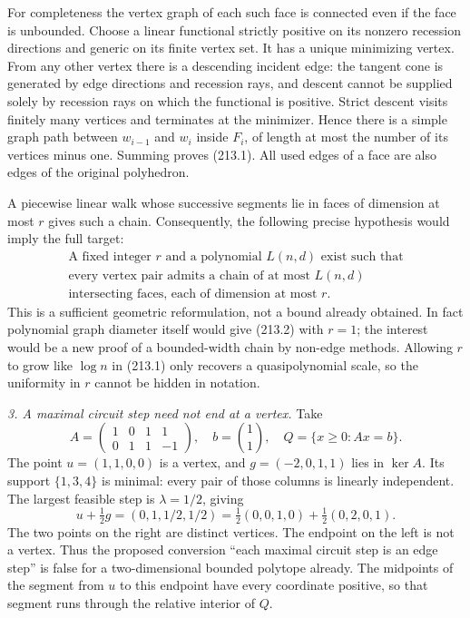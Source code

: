 \documentclass[11pt,a4paper]{article}
\begin{document}
For completeness the vertex graph of each such face is connected even if
the face is unbounded. Choose a linear functional strictly positive on its
nonzero recession directions and generic on its finite vertex set. It has
a unique minimizing vertex. From any other vertex there is a descending
incident edge: the tangent cone is generated by edge directions and
recession rays, and descent cannot be supplied solely by recession rays
on which the functional is positive. Strict descent visits finitely many
vertices and terminates at the minimizer. Hence there is a simple graph
path between $w_{i-1}$ and $w_i$ inside $F_i$, of length at most the number
of its vertices minus one. Summing proves (213.1). All used edges of a face
are also edges of the original polyhedron.

A piecewise linear walk whose successive segments lie in faces of dimension
at most $r$ gives such a chain. Consequently, the following precise
hypothesis would imply the full target:
\begin{equation}\tag{213.2}
 \begin{gathered}
 \text{A fixed integer }r\text{ and a polynomial }L(n,d)\text{ exist such that}\\
 \text{every vertex pair admits a chain of at most }L(n,d)\\
 \text{intersecting faces, each of dimension at most }r.
 \end{gathered}
\end{equation}
This is a sufficient geometric reformulation, not a bound already obtained.
In fact polynomial graph diameter itself would give (213.2) with $r=1$;
the interest would be a new proof of a bounded-width chain by non-edge
methods. Allowing $r$ to grow like $\log n$ in (213.1) only recovers a
quasipolynomial scale, so the uniformity in $r$ cannot be hidden in notation.

\textit{3. A maximal circuit step need not end at a vertex.}
Take
\[
 A=\begin{pmatrix}1&0&1&1\\0&1&1&-1\end{pmatrix},\quad
 b=\binom11,\quad Q=\{x\ge0:Ax=b\}.
\]
The point $u=(1,1,0,0)$ is a vertex, and
$g=(-2,0,1,1)$ lies in $\ker A$. Its support $\{1,3,4\}$ is minimal:
every pair of those columns is linearly independent. The largest feasible
step is $\lambda=1/2$, giving
\[
 u+\tfrac12 g=(0,1,1/2,1/2)
 =\tfrac12(0,0,1,0)+\tfrac12(0,2,0,1).                        \tag{213.3}
\]
The two points on the right are distinct vertices. The endpoint on the left
is not a vertex. Thus the proposed conversion ``each maximal circuit step
is an edge step'' is false for a two-dimensional bounded polytope already.
The midpoints of the segment from $u$ to this endpoint have every coordinate
positive, so that segment runs through the relative interior of $Q$.
\end{document}
